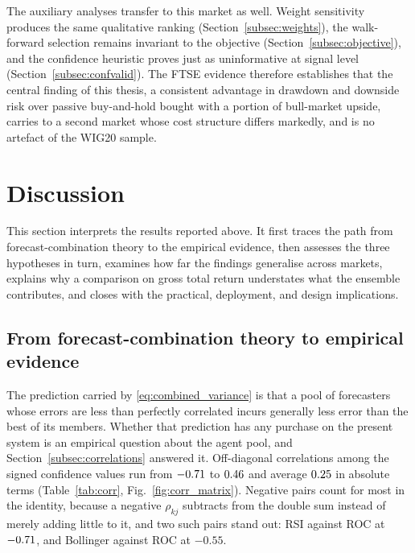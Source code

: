 The auxiliary analyses transfer to this market as well. Weight sensitivity produces the same qualitative ranking (Section~\ref{subsec:weights}), the walk-forward selection remains invariant to the objective (Section~\ref{subsec:objective}), and the confidence heuristic proves just as uninformative at signal level (Section~\ref{subsec:confvalid}). The FTSE evidence therefore establishes that the central finding of this thesis, a consistent advantage in drawdown and downside risk over passive buy-and-hold bought with a portion of bull-market upside, carries to a second market whose cost structure differs markedly, and is no artefact of the WIG20 sample.

\section{Discussion}\label{sec:discussion}

This section interprets the results reported above. It first traces the path from forecast-combination theory to the empirical evidence, then assesses the three hypotheses in turn, examines how far the findings generalise across markets, explains why a comparison on gross total return understates what the ensemble contributes, and closes with the practical, deployment, and design implications.

\subsection{From forecast-combination theory to empirical evidence}\label{subsec:theory_to_evidence}

The prediction carried by \eqref{eq:combined_variance} is that a pool of forecasters whose errors are less than perfectly correlated incurs generally less error than the best of its members. Whether that prediction has any purchase on the present system is an empirical question about the agent pool, and Section~\ref{subsec:correlations} answered it. Off-diagonal correlations among the signed confidence values run from $-0.71{}$ to $0.46{}$ and average $0.25{}$ in absolute terms (Table~\ref{tab:corr}, Fig.~\ref{fig:corr_matrix}). Negative pairs count for most in the identity, because a negative $\rho_{kj}$ subtracts from the double sum instead of merely adding little to it, and two such pairs stand out: RSI against ROC at $-0.71{}$, and Bollinger against ROC at $-0.55$.

